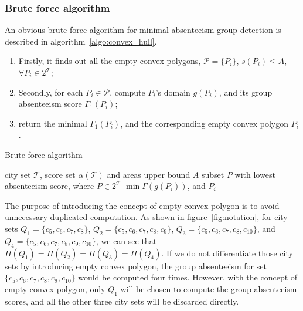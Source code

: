 \subsubsection{Brute force algorithm}
An obvious brute force algorithm for minimal absenteeism group detection is described in algorithm~\ref{algo:convex_hull}.
\begin{enumerate}
  \item Firstly, it finds out all the empty convex polygons, $\mathcal{P}= \{P_i\}$, $s(P_i)\leq A$, $\forall P_i\in 2^\mathcal{T}$;
  \item Secondly, for each $P_i \in \mathcal{P}$, compute $P_i$'s domain $g(P_i)$, and its group absenteeism score $\Gamma_1(P_i)$;
  \item return the minimal $\Gamma_1(P_i)$, and the corresponding empty convex polygon $P_i$.
\end{enumerate}

\begin{algorithm}[h]
\centering
\captionsetup{font=scriptsize}
\caption{Brute force algorithm}
{\footnotesize \begin{algorithmic}[1]
 city set $\mathcal{T}$, score set $\alpha(\mathcal{T})$ and areas upper bound $A$
 subset $P$ with lowest absenteeism score, where $P\in 2^{\mathcal{T}}$	
					\ENDIF
			\ENDIF
	\ENDFOR	
	\ENDFOR	
\RETURN $\min\Gamma(g(P_i))$, and $P_i$
\end{algorithmic}}
\label{algo:convex_hull}
\end{algorithm}


The purpose of introducing the concept of empty convex polygon is to avoid unnecessary duplicated computation. As shown in figure~\ref{fig:notation}, for city sets $Q_1=\{c_5, c_6, c_7, c_8\}$, $Q_2=\{c_5, c_6,c_7, c_8, c_9\}$, $Q_3=\{c_5, c_6, c_7, c_8, c_{10}\}$, and $Q_4=\{c_5, c_6,c_7, c_8, c_9, c_{10}\}$, we can see that $H(Q_1)=H(Q_2)=H(Q_3)=H(Q_4)$. If we do not differentiate those city sets by introducing empty convex polygon, the group absenteeism for set $\{c_5, c_6, c_7, c_8, c_9, c_{10}\}$ would be computed four times. However, with the concept of empty convex polygon, only $Q_1$ will be chosen to compute the group absenteeism scores, and all the other three city sets will be discarded directly.


